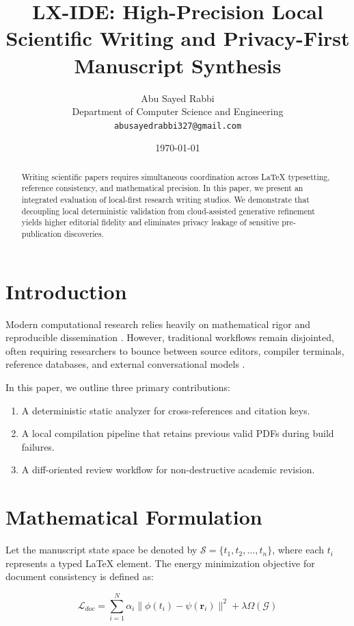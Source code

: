 \documentclass[11pt,a4paper]{article}
\title{LX-IDE: High-Precision Local Scientific Writing and Privacy-First Manuscript Synthesis}
\author{Abu Sayed Rabbi\\
\small Department of Computer Science and Engineering\\
\small \texttt{abusayedrabbi327@gmail.com}}
\date{\today}
\begin{document}
\maketitle

\begin{abstract}
Writing scientific papers requires simultaneous coordination across LaTeX typesetting, reference consistency, and mathematical precision. In this paper, we present an integrated evaluation of local-first research writing studios. We demonstrate that decoupling local deterministic validation from cloud-assisted generative refinement yields higher editorial fidelity and eliminates privacy leakage of sensitive pre-publication discoveries.
\end{abstract}

\section{Introduction}
\label{sec:intro}
Modern computational research relies heavily on mathematical rigor and reproducible dissemination \cite{vaswani2017attention}. However, traditional workflows remain disjointed, often requiring researchers to bounce between source editors, compiler terminals, reference databases, and external conversational models \cite{he2016deep}.

In this paper, we outline three primary contributions:
\begin{enumerate}
    \item A deterministic static analyzer for cross-references and citation keys.
    \item A local compilation pipeline that retains previous valid PDFs during build failures.
    \item A diff-oriented review workflow for non-destructive academic revision.
\end{enumerate}

\section{Mathematical Formulation}
\label{sec:method}
Let the manuscript state space be denoted by $\mathcal{S} = \{t_1, t_2, \dots, t_n\}$, where each $t_i$ represents a typed LaTeX element. The energy minimization objective for document consistency is defined as:

\begin{equation}
\label{eq:consistency}
\mathcal{L}_{doc} = \sum_{i=1}^N \alpha_i \| \phi(t_i) - \psi(\mathbf{r}_i) \|^2 + \lambda \Omega(\mathcal{G})
\end{equation}
\end{document}
